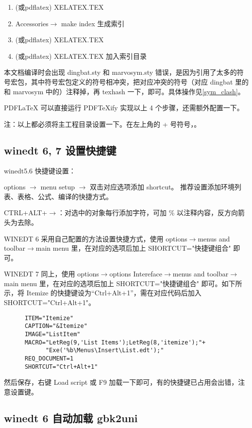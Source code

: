 \begin{enumerate}
  \item \XeLaTeX (或pdflatex) XELATEX.TEX
  \item Accessories$\rightarrow$ make index 生成索引
  \item \XeLaTeX (或pdflatex) XELATEX.TEX
  \item \XeLaTeX (或pdflatex) XELATEX.TEX 加入索引目录
\end{enumerate}

本文档编译时会出现 dingbat.sty 和 marvosym.sty 错误，是因为引用了太多的符号宏包，其中符号宏包定义的符号相冲突，把对应冲突的符号（对应 dingbat 里的 和 marvosym 中的）注释掉，再 texhash 一下，即可。具体操作见\ref{sym_clash}。


PDFLaTeX 可以直接运行 PDFTeXify 实现以上 4 个步骤，\XeLaTeX 还需额外配置一下。

注：以上都必须将主工程目录设置一下。在左上角的 + 号符号，。
\subsection{winedt 6, 7 设置快捷键}
\textcolor[rgb]{1.00,0.00,0.00}{winedt5.6 快捷键设置：}

options $\rightarrow$ menu setup $\rightarrow$ 双击对应选项添加 shortcut。
推荐设置添加环境列表、表格、公式、编译的快捷方式。

CTRL+ALT+$\rightarrow$：对选中的对象每行添加字符，可加 \% 以注释内容，反方向箭头为去除。

WINEDT 6 采用自己配置的方法设置快捷方式，使用
options$\rightarrow$menus and toolbar$\rightarrow$main menu 里，在对应的选项后加上 SHORTCUT="快捷键组合" 即可。


WINEDT 7 同上，使用
options$\rightarrow$options Intereface$\rightarrow$menus and toolbar$\rightarrow$main menu 里，在对应的选项后加上 SHORTCUT="快捷键组合" 即可。如下所示，将 Itemize 的快捷键设为“Ctrl+Alt+1”，需在对应代码后加入 SHORTCUT="Ctrl+Alt+1"。

\begin{lstlisting}
      ITEM="Itemize"
      CAPTION="&Itemize"
      IMAGE="ListItem"
      MACRO="LetReg(9,'List Items');LetReg(8,'itemize');"+
            "Exe('%b\Menus\Insert\List.edt');"
      REQ_DOCUMENT=1
      SHORTCUT="Ctrl+Alt+1"
\end{lstlisting}

然后保存，右键 Load script 或 F9 加载一下即可，有的快捷键已占用会出错，注意设置键。

\subsection{winedt 6 自动加载 gbk2uni}

